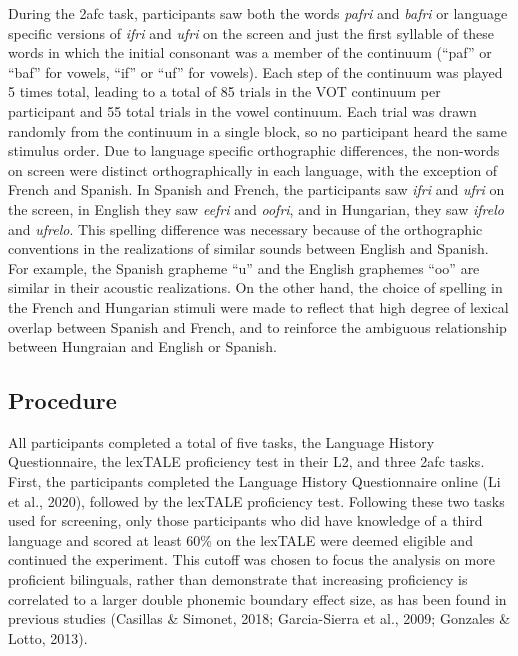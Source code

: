\documentclass[
  man]{apa6}
\begin{document}
During the 2afc task, participants saw both the words \emph{pafri} and \emph{bafri} or language specific versions of \emph{ifri} and \emph{ufri} on the screen and just the first syllable of these words in which the initial consonant was a member of the continuum (``paf'' or ``baf'' for vowels, ``if'' or ``uf'' for vowels).
Each step of the continuum was played 5 times total, leading to a total of 85 trials in the VOT continuum per participant and 55 total trials in the vowel continuum.
Each trial was drawn randomly from the continuum in a single block, so no participant heard the same stimulus order.
Due to language specific orthographic differences, the non-words on screen were distinct orthographically in each language, with the exception of French and Spanish.
In Spanish and French, the participants saw \emph{ifri} and \emph{ufri} on the screen, in English they saw \emph{eefri} and \emph{oofri}, and in Hungarian, they saw \emph{ifrelo} and \emph{ufrelo}. This spelling difference was necessary because of the orthographic conventions in the realizations of similar sounds between English and Spanish. For example, the Spanish grapheme ``u'' and the English graphemes ``oo'' are similar in their acoustic realizations. On the other hand, the choice of spelling in the French and Hungarian stimuli were made to reflect that high degree of lexical overlap between Spanish and French, and to reinforce the ambiguous relationship between Hungraian and English or Spanish.

\hypertarget{procedure}{%
\subsection{Procedure}\label{procedure}}

All participants completed a total of five tasks, the Language History Questionnaire, the lexTALE proficiency test in their L2, and three 2afc tasks. First, the participants completed the Language History Questionnaire online (Li et al., 2020), followed by the lexTALE proficiency test.
Following these two tasks used for screening, only those participants who did have knowledge of a third language and scored at least 60\% on the lexTALE were deemed eligible and continued the experiment. This cutoff was chosen to focus the analysis on more proficient bilinguals, rather than demonstrate that increasing proficiency is correlated to a larger double phonemic boundary effect size, as has been found in previous studies (Casillas \& Simonet, 2018; Garcia-Sierra et al., 2009; Gonzales \& Lotto, 2013).
\end{document}
